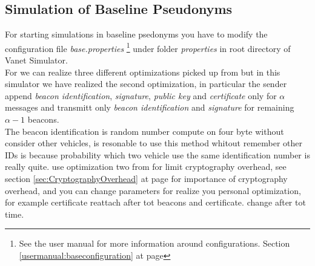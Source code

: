\subsection{Simulation of Baseline Pseudonyms}
For starting simulations in baseline psedonyms you have to modify the configuration file \textit{base.properties} \footnote{See the user manual for more information around configurations. Section \ref{usermanual:baseconfiguration} at page \pageref{usermanual:baseconfiguration}} under folder \textit{properties} in root directory of Vanet Simulator.\\
For \baseline we can realize three different optimizations picked up from \cite{calandriello} but in this simulator we have realized the second optimization, in particular the sender append \textit{beacon identification}, \textit{signature}, \textit{public key} and \textit{certificate} only for $\alpha$ messages and transmitt only \textit{beacon identification} and \textit{signature} for remaining $\alpha-1$ beacons. \\
The beacon identification is random number compute on four byte without consider other vehicles, is resonable to use this method whitout remember other IDs is because probability which two vehicle use the same identification number is really quite.
\baseline use optimization two from \cite{calandriello} for limit cryptography overhead, see section \ref{sec:CryptographyOverhead} at page \pageref{sec:CryptographyOverhead} for importance of cryptography overhead, and you can change parameters for realize you personal optimization, for example certificate reattach after tot beacons and certificate. change after tot time.